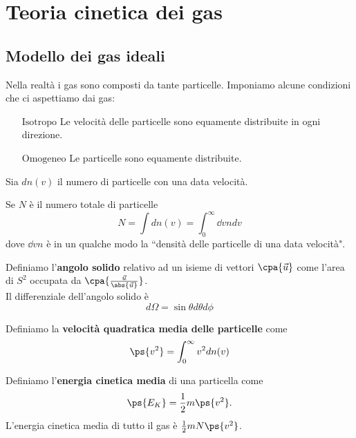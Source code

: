 \chapter{Teoria cinetica dei gas}


\section{Modello dei gas ideali}
Nella realt\`a i gas sono composti da tante particelle. Imponiamo alcune condizioni che ci aspettiamo dai gas:
\setlength{\leftmargini}{0cm}
\begin{itemize}
\item[$\boxed{\text{Isotropo}}$] Le velocit\`a delle particelle sono equamente distribuite in ogni direzione.
\item[$\boxed{\text{Omogeneo}}$] Le particelle sono equamente distribuite.
\end{itemize}
\setlength{\leftmargini}{0.5cm}
Sia $dn(v)$ il numero di particelle con una data velocit\`a.
\begin{remark}
Se $N$ \`e il numero totale di particelle
\[N=\int dn(v)=\int_0^\infty \dd vndv\]
dove $\dd vn$ \`e in un qualche modo la ``densit\`a delle particelle di una data velocit\`a".
\end{remark}

\begin{definition}
Definiamo l'\textbf{angolo solido} relativo ad un isieme di vettori $\cpa{\vec u}$ come l'area di $S^2$ occupata da $\cpa{\frac{\vec u}{\abs{\vec u}}}$.\\
Il differenziale dell'angolo solido \`e 
\[d\Omega=\sin\theta d\theta d\phi\]
\end{definition}

\begin{definition}
Definiamo la \textbf{velocit\`a quadratica media delle particelle} come
\[\ps{v^2}=\int_0^\infty v^2dn(v)\] 
\end{definition}

\begin{definition}
Definiamo l'\textbf{energia cinetica media} di una particella come \[\ps{E_K}=\frac12m\ps{v^2}.\]
L'energia cinetica media di tutto il gas \`e $\frac12mN\ps{v^2}$.
\end{definition}

